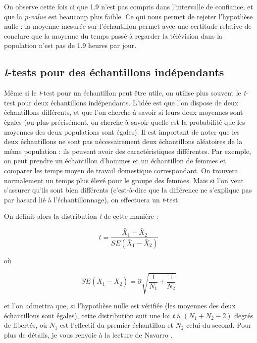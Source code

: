 \documentclass[
]{book}
\begin{document}
On observe cette fois ci que 1.9 n'est pas compris dans l'intervalle de confiance, et que la \emph{p-value} est beaucoup plus faible. Ce qui nous permet de rejeter l'hypothèse nulle : la moyenne mesurée sur l'échantillon permet avec une certitude relative de conclure que la moyenne du temps passé à regarder la télévision dans la population n'est pas de 1.9 heures par jour.

\hypertarget{t-tests-pour-des-uxe9chantillons-induxe9pendants}{%
\subsection{\texorpdfstring{\emph{t}-tests pour des échantillons indépendants}{t-tests pour des échantillons indépendants}}\label{t-tests-pour-des-uxe9chantillons-induxe9pendants}}

Même si le \emph{t}-test pour un échantillon peut être utile, on utilise plus souvent le \emph{t}-test pour deux échantillons indépendants. L'idée est que l'on dispose de deux échantillons différents, et que l'on cherche à savoir si leurs deux moyennes sont égales (ou plus précisément, on cherche à savoir quelle est la probabilité que les moyennes des deux populations sont égales). Il est important de noter que les deux échantillons ne sont pas nécessairement deux échantillons aléatoires de la même population : ils peuvent avoir des caractéristiques différentes. Par exemple, on peut prendre un échantillon d'hommes et un échantillon de femmes et comparer les temps moyen de travail domestique correspondant. On trouvera normalement un temps plus élevé pour le groupe des femmes. Mais si l'on veut s'assurer qu'ils sont bien différents (c'est-à-dire que la différence ne s'explique pas par hasard lié à l'échantillonnage), on effectuera un \emph{t}-test.

On définit alors la distribution \emph{t} de cette manière :

\[ t = \frac{\bar{X}_1 - \bar{X}_2}{SE(\bar{X}_1 - \bar{X}_2)}\]

où

\[ SE(\bar{X}_1 - \bar{X}_2) = \hat{\sigma} \sqrt{\frac{1}{N_1} + \frac{1}{N_2}}\]

et l'on admettra que, si l'hypothèse nulle est vérifiée (les moyennes des deux échantillons sont égales), cette distribution suit une loi \emph{t} à \((N_1+N_2-2)\) degrés de libertés, où \(N_1\) est l'effectif du premier échantillon et \(N_2\) celui du second. Pour plus de détails, je vous renvoie à la lecture de Navarro \citep[chapitre 13]{navarro2015}.
\end{document}
